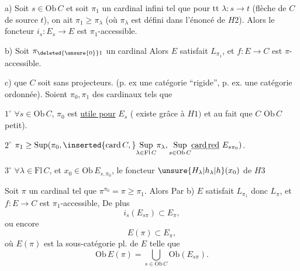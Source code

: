 
a) Soit $s\in\mathrm{Ob}\,C$ et soit $\pi_1$ un cardinal infini tel que pour tt $\lambda:s\to t$ (flèche de $C$ de source $t$), on ait $\pi_1\geq\pi_\lambda$ (où $\pi_\lambda$ est défini dans l'énoncé de $H2$). Alors le foncteur $i_s:E_s\longrightarrow E$  est $\pi_1$-accessible.

b)  Soit $\pi_{\deleted{\unsure{0}}1}$ un cardinal   Alors $E$ satisfait $L_{\pi_1}$, et $f:E\to C$ est $\pi$-accessible.

c)   que $C$ soit sans projecteurs. (p. ex une catégorie ``rigide'', p. ex. une catégorie ordonnée). Soient $\pi_0,\pi_1$ des cardinaux tels que

\textcircled{\scriptsize $1^\circ$}  $\forall s\in\mathrm{Ob}\,C$, $\pi_0$ est \uline{utile pour} $E_s$ ( existe grâce à $H1)$ et au fait que $C$  $\mathrm{Ob}\,C$ petit).

\textcircled{\scriptsize $2^\circ$} $\pi_1\geq\mathrm{Sup}(\pi_0,\inserted{\mathrm{card}\,C,}\underset{\lambda\in\mathrm{Fl}\,C}{\mathrm{Sup}}\pi_\lambda,\underset{s\in\mathrm{Ob}\,C}{\mathrm{Sup}}\underline{\mathrm{card\,red}}\ E_{s\pi_0})$.

\textcircled{\scriptsize $3^\circ$} $\forall\lambda\in\mathrm{Fl}\,C$, et $x_0\in\mathrm{Ob}\,E_{s,\pi_0}$, le foncteur $\unsure{H_\lambda|h_\lambda|h} (x_0)$ de $H3$ 

Soit $\pi$  un cardinal tel que $\pi^{\pi_0}=\pi\geq\pi_1$. Alors Par b) $E$ satisfait $L_{\pi_1}$ donc $L_\pi$, et $f:E\to C$ est $\pi_1$-accessible, De plus
\[i_s(E_{s\pi})\subset E_\pi,\]
 ou encore  
\[E(\pi)\subset E_\pi,\]
où $E(\pi)$ est la sous-catégorie pl. de $E$  telle que
\[\mathrm{Ob}\,E(\pi)=\bigcup_{s\in\mathrm{Ob}\,C}\mathrm{Ob}(E_{s\pi}).\]

